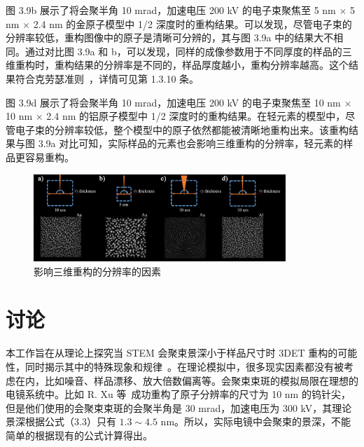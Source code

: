 图 3.9b 展示了将会聚半角 10 mrad，加速电压 200 kV 的电子束聚焦至 5 nm $\times$ 5 nm $\times$ 2.4 nm 的金原子模型中 1/2 深度时的重构结果。可以发现，尽管电子束的分辨率较低，重构图像中的原子是清晰可分辨的，其与图 3.9a 中的结果大不相同。通过对比图 3.9a 和 b，可以发现，同样的成像参数用于不同厚度的样品的三维重构时，重构结果的分辨率是不同的，样品厚度越小，重构分辨率越高。这个结果符合克劳瑟准则~\cite{Crowther1970}，详情可见第 1.3.10 条。

图 3.9d 展示了将会聚半角 10 mrad，加速电压 200 kV 的电子束聚焦至 10 nm $\times$ 10 nm $\times$ 2.4 nm 的铝原子模型中 1/2 深度时的重构结果。在轻元素的模型中，尽管电子束的分辨率较低，整个模型中的原子依然都能被清晰地重构出来。该重构结果与图 3.9a 对比可知，实际样品的元素也会影响三维重构的分辨率，轻元素的样品更容易重构。

\begin{figure}[H]
	\vspace{\baselineskip}
	\centering
	\includegraphics[width=0.85\textwidth]{../4.8/48}
	\caption{影响三维重构的分辨率的因素}\label{fig:48}
	\song{}
\end{figure}

\section{讨论}
本工作旨在从理论上探究当 STEM 会聚束景深小于样品尺寸时 3DET 重构的可能性，同时揭示其中的特殊现象和规律~\cite{SRH2020}。在理论模拟中，很多现实因素都没有被考虑在内，比如噪音、样品漂移、放大倍数偏离等。会聚束束斑的模拟局限在理想的电镜系统中。比如 R. Xu 等~\cite{Xu2015}成功重构了原子分辨率的尺寸为 10 nm 的钨针尖，但是他们使用的会聚束束斑的会聚半角是 30 mrad，加速电压为 300 kV，其理论景深根据公式（3.3）只有 $1.3\sim4.5$ nm。所以，实际电镜中会聚束的景深，不能简单的根据现有的公式计算得出。



